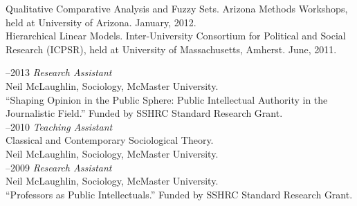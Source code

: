 \documentclass[11pt,usenames,dvipsnames]{article}
\begin{document}
\bigskip
\bigskip
{}

\noindent Qualitative Comparative Analysis and Fuzzy Sets. Arizona Methods Workshops, held at University of Arizona. January, 2012.\\

\noindent Hierarchical Linear Models. Inter-University Consortium for Political and Social Research (ICPSR), held at University of Massachusetts, Amherst. June, 2011.\\


–2013 {\it Research Assistant}\\
Neil McLaughlin, Sociology, McMaster University.\\ 
``Shaping Opinion in the Public Sphere: Public Intellectual Authority in the Journalistic Field.'' Funded by SSHRC Standard Research Grant.\\

–2010 {\it Teaching Assistant}\\
Classical and Contemporary Sociological Theory.\\
Neil McLaughlin, Sociology, McMaster University.\\

–2009 {\it Research Assistant}\\
Neil McLaughlin, Sociology, McMaster University.\\ 
``Professors as Public Intellectuals.'' Funded by SSHRC Standard Research Grant.\\



\end{document}
